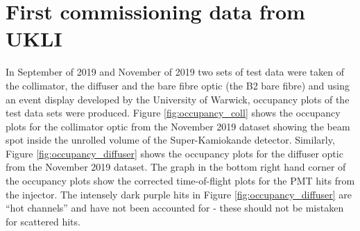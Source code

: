 \section{First commissioning data from UKLI}

In September of 2019 and November of 2019 two sets of test data were taken of the collimator, the diffuser and the bare fibre optic (the B2 bare fibre) and using an event display developed by the University of Warwick, occupancy plots of the test data sets were produced. Figure \ref{fig:occupancy_coll} shows the occupancy plots for the collimator optic from the November 2019 dataset showing the beam spot inside the unrolled volume of the Super-Kamiokande detector. Similarly, Figure \ref{fig:occupancy_diffuser} shows the occupancy plots for the diffuser optic from the November 2019 dataset. The graph in the bottom right hand corner of the occupancy plots show the corrected time-of-flight plots for the PMT hits from the injector. The intensely dark purple hits in Figure \ref{fig:occupancy_diffuser} are ``hot channels'' and have not been accounted for - these should not be mistaken for scattered hits.



